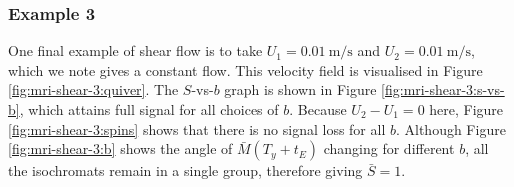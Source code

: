             \subsubsection{Example 3} \label{sec:numerical-mri:manufactured:shear:3}
                One final example of shear flow is to take $U_1 = \qty{0.01}{\metre\per\second}$ and $U_2 = \qty{0.01}{\metre\per\second}$, which we note gives a constant flow. This velocity field is visualised in Figure \ref{fig:mri-shear-3:quiver}. The $S$-vs-$b$ graph is shown in Figure \ref{fig:mri-shear-3:s-vs-b}, which attains full signal for all choices of $b$. Because $U_2 - U_1 = 0$ here, Figure \ref{fig:mri-shear-3:spins} shows that there is no signal loss for all $b$. Although Figure \ref{fig:mri-shear-3:b} shows the angle of $\bar{M}(T_y + t_E)$ changing for different $b$, all the isochromats remain in a single group, therefore giving $\bar{S}=1$.
    
